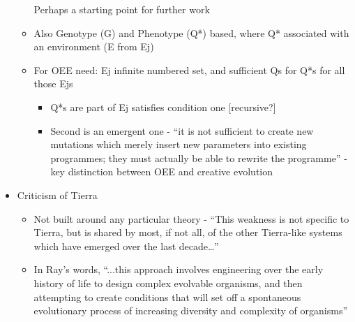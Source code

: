 \begin{itemize}
\begin{itemize}
	      	      Perhaps a starting point for further work
	      	      		
	      	\item
	      	      		
	      	      Also Genotype (G) and Phenotype (Q*) based, where Q* associated with
	      	      an environment (E from Ej)
	      	      		
	      	\item
	      	      		
	      	      For OEE need: Ej infinite numbered set, and sufficient Qs for Q*s
	      	      for all those Ejs
	      	      		
	      	      		
	      	      \begin{itemize}
	      	      	\item
	      	      	      			
	      	      	      Q*s are part of Ej satisfies condition one {[}recursive?{]}
	      	      	      			
	      	      	\item
	      	      	      			
	      	      	      Second is an emergent one - ``it is not sufficient to create new
	      	      	      mutations which merely insert new parameters into existing
	      	      	      programmes; they must actually be able to rewrite the programme''
	      	      	      - key distinction between OEE and creative evolution
	      	      	      			
	      	      \end{itemize}
	      \end{itemize}
	\item
	      	
	      Criticism of Tierra
	      	
	      	
	      \begin{itemize}
	      	\item
	      	      		
	      	      Not built around any particular theory - ``This weakness is not
	      	      specific to Tierra, but is shared by most, if not all, of the other
	      	      Tierra-like systems which have emerged over the last
	      	      decade\ldots{}''
	      	      		
	      	\item
	      	      		
	      	      In Ray's words, ``...this approach involves engineering over the
	      	      early history of life to design complex evolvable organisms, and
	      	      then attempting to create conditions that will set off a spontaneous
	      	      evolutionary process of increasing diversity and complexity of
	      	      organisms''
	      	      		

\end{itemize}
\end{itemize}
